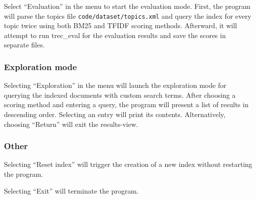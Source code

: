 Select \enquote{Evaluation} in the menu to start the evaluation mode.
First, the program will parse the topics file \verb|code/dataset/topics.xml| and query the index for every topic twice using both BM25 and TFIDF scoring methods.
Afterward, it will attempt to run trec\_eval for the evaluation results and save the scores in separate files.


\subsubsection{Exploration mode}

Selecting \enquote{Exploration} in the menu will launch the exploration mode for querying the indexed documents with custom search terms.
After choosing a scoring method and entering a query, the program will present a list of results in descending order.
Selecting an entry will print its contents.
Alternatively, choosing \enquote{Return} will exit the results-view.

\subsubsection{Other}

Selecting \enquote{Reset index} will trigger the creation of a new index without restarting the program.

Selecting \enquote{Exit} will terminate the program.
